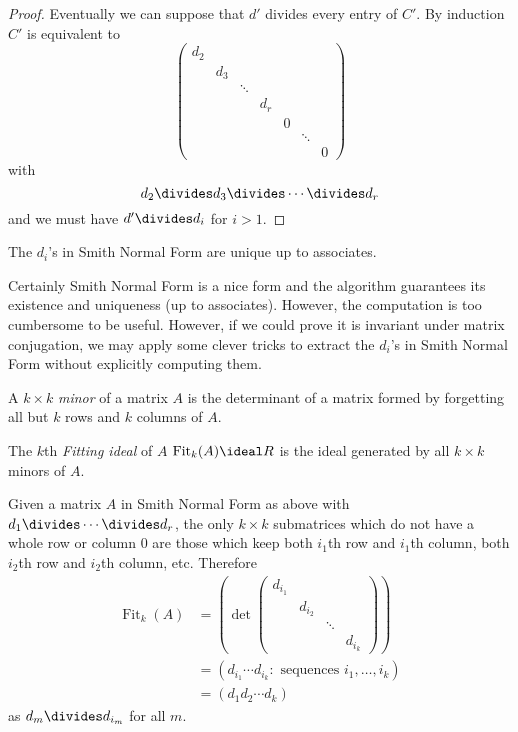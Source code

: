 \documentclass[a4paper]{article}
\theoremstyle{definition}
\DeclareMathOperator{\fit}{Fit}
\begin{document}
\begin{proof}
  Eventually we can suppose that \(d'\) divides every entry of \(C'\). By induction \(C'\) is equivalent to
  \[
    \begin{pmatrix}
      d_2 \\
      & d_3 \\
      & & \ddots \\
      & & & d_r \\
      & & & & 0 \\
      & & & & & \ddots \\
      & & & & & & 0
    \end{pmatrix}
  \]
  with
  \[
    d_2 \divides d_3 \divides \cdots \divides d_r
  \]
  and we must have \(d' \divides d_i\) for \(i > 1\).
\end{proof}

\begin{remark}
  The \(d_i\)'s in Smith Normal Form are unique up to associates.
\end{remark}

Certainly Smith Normal Form is a nice form and the algorithm guarantees its existence and uniqueness (up to associates). However, the computation is too cumbersome to be useful. However, if we could prove it is invariant under matrix conjugation, we may apply some clever tricks to extract the \(d_i\)'s in Smith Normal Form without explicitly computing them.

\begin{definition}[Minor]
  A \(k \times k\) \emph{minor} of a matrix \(A\) is the determinant of a matrix formed by forgetting all but \(k\) rows and \(k\) columns of \(A\).
\end{definition}

\begin{definition}
  The \(k\)th \emph{Fitting ideal} of \(A\) \(\fit_k(A) \ideal R\) is the ideal generated by all \(k \times k\) minors of \(A\).
\end{definition}

Given a matrix \(A\) in Smith Normal Form as above with \(d_1 \divides \cdots \divides d_r\), the only \(k \times k\) submatrices which do not have a whole row or column \(0\) are those which keep both \(i_1\)th row and \(i_1\)th column, both \(i_2\)th row and \(i_2\)th column, etc. Therefore
\begin{align*}
  \fit_k(A) &= \left(\det
    \begin{pmatrix}
      d_{i_1} \\
      & d_{i_2} \\
      & & \ddots \\
      & & & d_{i_k}
    \end{pmatrix}
  \right) \\
            &= (d_{i_1} \cdots d_{i_k}: \text{ sequences } i_1, \dots, i_k) \\
            &= (d_1d_2 \cdots d_k)
\end{align*}
as \(d_m \divides d_{i_m}\) for all \(m\).
\end{document}

